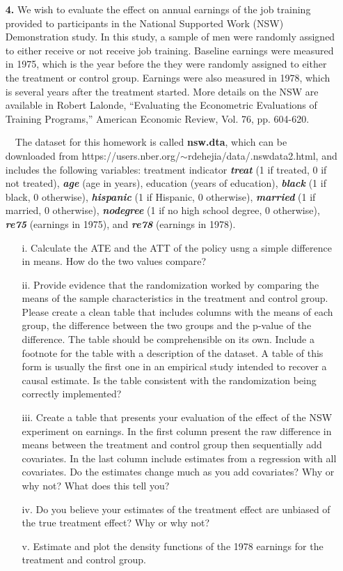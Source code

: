 \documentclass[a4paper]{ctexart}
\theoremstyle{remark}
\begin{document}
\begin{itemize}
\item[\textbf{4.}] We wish to evaluate the effect on annual earnings of the job training provided to participants in the National Supported Work (NSW) Demonstration study. In this study, a sample of men were randomly assigned to either receive or not receive job training. Baseline earnings were measured in 1975, which is the year before the they were randomly assigned to either the treatment or control group. Earnings were also measured in 1978, which is several years after the treatment started. More details on the NSW are available in Robert Lalonde, ``Evaluating the Econometric Evaluations of Training Programs,” American Economic Review, Vol. 76, pp. 604-620.

~~The dataset for this homework is called \textbf{nsw.dta}, which can be downloaded from https://users.nber.org/$\sim$rdehejia/data/.nswdata2.html,  and includes the following variables: treatment indicator \textit{\textbf{treat}} (1 if treated, 0 if not treated), \textit{\textbf{age}} (age in years), education (years of education), \textit{\textbf{black}} (1 if black, 0 otherwise), \textit{\textbf{hispanic}} (1 if Hispanic, 0 otherwise), \textit{\textbf{married}} (1 if married, 0 otherwise), \textit{\textbf{nodegree}} (1 if no high school degree, 0 otherwise), \textit{\textbf{re75}} (earnings in 1975), and \textit{\textbf{re78}} (earnings in 1978). 

\begin{enumerate}
\item[i.] Calculate the ATE and the ATT of the policy usng a simple difference in means. How do the two values compare?
\item[ii.] Provide evidence that the randomization worked by comparing the means of the sample characteristics in the treatment and control group. Please create a clean table that includes columns with the means of each group, the difference between the two groups and the p-value of the difference. The table should be comprehensible on its own. Include a footnote for the table with a description of the dataset. A table of this form is usually the first one in an empirical study intended to recover a causal estimate. Is the table consistent with the randomization being correctly implemented?
\item[iii.]  Create a table that presents your evaluation of the effect of the NSW experiment on earnings. In the first column present the raw difference in means between the treatment and control group then sequentially add covariates. In the last column include estimates from a regression with all covariates. Do the estimates change much as you add covariates? Why or why not? What does this tell you?
\item[iv.]  Do you believe your estimates of the treatment effect are unbiased of the true treatment effect? Why or why not?
\item[v.]  Estimate and plot the density functions of the 1978 earnings for the treatment and control group.
\end{enumerate}


\end{itemize}
\end{document}
